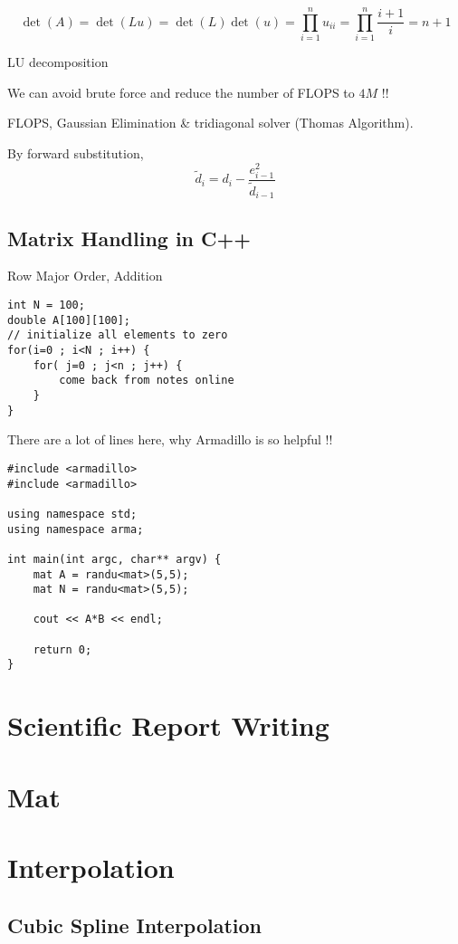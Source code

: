 \documentclass[10pt]{article} %
\begin{document}
\[ \det(A) = \det(Lu) = \det(L) \det(u) = \prod_{i=1}^n u_{ii} = \prod_{i=1}^n \dfrac{i+1}{i} = n + 1 \]

LU  decomposition

We can avoid brute force and reduce the number of FLOPS to $4M$ !!

FLOPS, Gaussian Elimination \& tridiagonal solver (Thomas Algorithm).

By forward substitution, \[ \tilde{d}_i = d_i - \dfrac{e^2_{i-1}}{\tilde{d}_{i-1}} \]

\subsection{Matrix Handling in C++}

Row Major Order, Addition
\begin{lstlisting}
int N = 100;
double A[100][100];
// initialize all elements to zero
for(i=0 ; i<N ; i++) {
    for( j=0 ; j<n ; j++) {
        come back from notes online
    }
}
\end{lstlisting}

There are a lot of lines here, why Armadillo is so helpful !!

\pagebreak
\begin{lstlisting}
#include <armadillo>
#include <armadillo>

using namespace std;
using namespace arma;

int main(int argc, char** argv) {
    mat A = randu<mat>(5,5);
    mat N = randu<mat>(5,5);

    cout << A*B << endl;

    return 0;
}
\end{lstlisting}

\section{Scientific Report Writing}

\section{Mat}

\section{Interpolation}

\subsection{Cubic Spline Interpolation}
\end{document}
